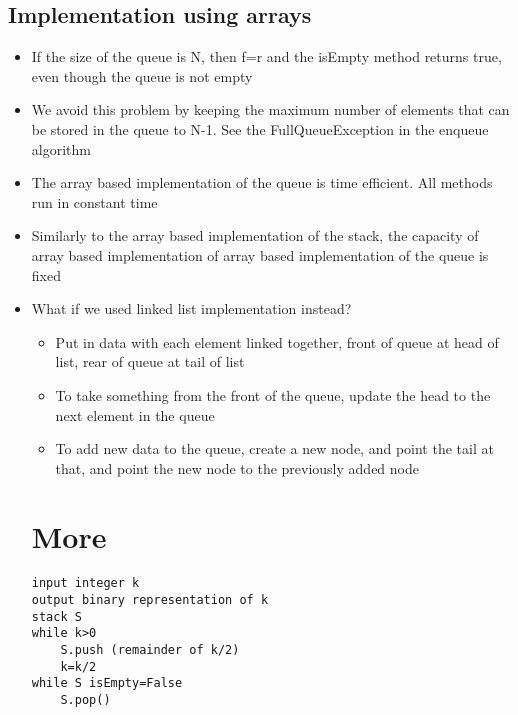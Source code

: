 \documentclass{article}[18pt]
\begin{document}
\subsection{Implementation using arrays}
\begin{itemize}
\item If the size of the queue is N, then f=r and the isEmpty method returns true, even though the queue is not empty
\item We avoid this problem by keeping the maximum number of elements that can be stored in the queue to N-1. See the FullQueueException in the enqueue algorithm
\item The array based implementation of the queue is time efficient. All methods run in constant time
\item Similarly to the array based implementation of the stack, the capacity of array based implementation of array based implementation of the queue is fixed
\item What if we used linked list implementation instead? 
\begin{itemize}
\item Put in data with each element linked together, front of queue at head of list, rear of queue at tail of list
\item To take something from the front of the queue, update the head to the next element in the queue
\item To add new data to the queue, create a new node, and point the tail at that, and point the new node to the previously added node
\end{itemize}

\section{More}
\begin{lstlisting}[mathescape=true]
input integer k
output binary representation of k
stack S
while k>0
	S.push (remainder of k/2)
	k=k/2
while S isEmpty=False
	S.pop()

\end{lstlisting}
\end{itemize}
\end{document}
